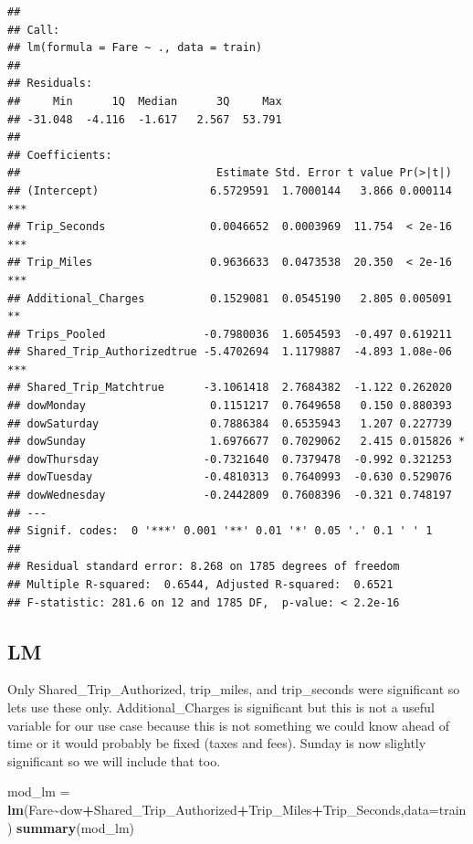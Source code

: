 \documentclass[
]{article}
\newenvironment{Shaded}{\begin{snugshade}}{\end{snugshade}}
\newcommand{\AttributeTok}[1]{\textcolor[rgb]{0.13,0.29,0.53}{#1}}
\newcommand{\FunctionTok}[1]{\textcolor[rgb]{0.13,0.29,0.53}{\textbf{#1}}}
\newcommand{\NormalTok}[1]{#1}
\newcommand{\OtherTok}[1]{\textcolor[rgb]{0.56,0.35,0.01}{#1}}
\newcommand{\SpecialCharTok}[1]{\textcolor[rgb]{0.81,0.36,0.00}{\textbf{#1}}}
\begin{document}
\begin{verbatim}
## 
## Call:
## lm(formula = Fare ~ ., data = train)
## 
## Residuals:
##     Min      1Q  Median      3Q     Max 
## -31.048  -4.116  -1.617   2.567  53.791 
## 
## Coefficients:
##                              Estimate Std. Error t value Pr(>|t|)    
## (Intercept)                 6.5729591  1.7000144   3.866 0.000114 ***
## Trip_Seconds                0.0046652  0.0003969  11.754  < 2e-16 ***
## Trip_Miles                  0.9636633  0.0473538  20.350  < 2e-16 ***
## Additional_Charges          0.1529081  0.0545190   2.805 0.005091 ** 
## Trips_Pooled               -0.7980036  1.6054593  -0.497 0.619211    
## Shared_Trip_Authorizedtrue -5.4702694  1.1179887  -4.893 1.08e-06 ***
## Shared_Trip_Matchtrue      -3.1061418  2.7684382  -1.122 0.262020    
## dowMonday                   0.1151217  0.7649658   0.150 0.880393    
## dowSaturday                 0.7886384  0.6535943   1.207 0.227739    
## dowSunday                   1.6976677  0.7029062   2.415 0.015826 *  
## dowThursday                -0.7321640  0.7379478  -0.992 0.321253    
## dowTuesday                 -0.4810313  0.7640993  -0.630 0.529076    
## dowWednesday               -0.2442809  0.7608396  -0.321 0.748197    
## ---
## Signif. codes:  0 '***' 0.001 '**' 0.01 '*' 0.05 '.' 0.1 ' ' 1
## 
## Residual standard error: 8.268 on 1785 degrees of freedom
## Multiple R-squared:  0.6544, Adjusted R-squared:  0.6521 
## F-statistic: 281.6 on 12 and 1785 DF,  p-value: < 2.2e-16
\end{verbatim}

\subsection{LM}\label{lm}

Only Shared\_Trip\_Authorized, trip\_miles, and trip\_seconds were
significant so lets use these only. Additional\_Charges is significant
but this is not a useful variable for our use case because this is not
something we could know ahead of time or it would probably be fixed
(taxes and fees). Sunday is now slightly significant so we will include
that too.

\begin{Shaded}
\begin{Highlighting}[]
\NormalTok{mod\_lm }\OtherTok{=} \FunctionTok{lm}\NormalTok{(Fare}\SpecialCharTok{\textasciitilde{}}\NormalTok{dow}\SpecialCharTok{+}\NormalTok{Shared\_Trip\_Authorized}\SpecialCharTok{+}\NormalTok{Trip\_Miles}\SpecialCharTok{+}\NormalTok{Trip\_Seconds,}\AttributeTok{data=}\NormalTok{train)}
\FunctionTok{summary}\NormalTok{(mod\_lm)}
\end{Highlighting}
\end{Shaded}
\end{document}
